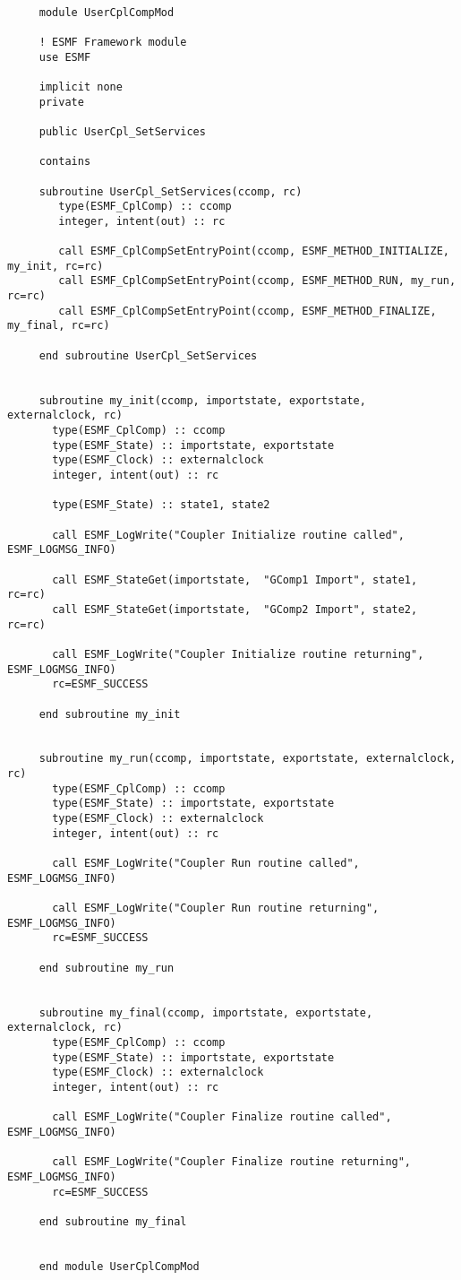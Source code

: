   
  \begin{verbatim}
 
     module UserCplCompMod
     
     ! ESMF Framework module
     use ESMF
     
     implicit none
     private
     
     public UserCpl_SetServices
 
     contains
 
     subroutine UserCpl_SetServices(ccomp, rc)
        type(ESMF_CplComp) :: ccomp
        integer, intent(out) :: rc
 
        call ESMF_CplCompSetEntryPoint(ccomp, ESMF_METHOD_INITIALIZE, my_init, rc=rc)
        call ESMF_CplCompSetEntryPoint(ccomp, ESMF_METHOD_RUN, my_run, rc=rc)
        call ESMF_CplCompSetEntryPoint(ccomp, ESMF_METHOD_FINALIZE, my_final, rc=rc)
 
     end subroutine UserCpl_SetServices
 
 
     subroutine my_init(ccomp, importstate, exportstate, externalclock, rc)
       type(ESMF_CplComp) :: ccomp
       type(ESMF_State) :: importstate, exportstate
       type(ESMF_Clock) :: externalclock
       integer, intent(out) :: rc
      
       type(ESMF_State) :: state1, state2
 
       call ESMF_LogWrite("Coupler Initialize routine called", ESMF_LOGMSG_INFO)
 
       call ESMF_StateGet(importstate,  "GComp1 Import", state1, rc=rc)
       call ESMF_StateGet(importstate,  "GComp2 Import", state2, rc=rc)
 
       call ESMF_LogWrite("Coupler Initialize routine returning", ESMF_LOGMSG_INFO)
       rc=ESMF_SUCCESS
 
     end subroutine my_init
 
 
     subroutine my_run(ccomp, importstate, exportstate, externalclock, rc)
       type(ESMF_CplComp) :: ccomp
       type(ESMF_State) :: importstate, exportstate
       type(ESMF_Clock) :: externalclock
       integer, intent(out) :: rc
      
       call ESMF_LogWrite("Coupler Run routine called", ESMF_LOGMSG_INFO)
 
       call ESMF_LogWrite("Coupler Run routine returning", ESMF_LOGMSG_INFO)
       rc=ESMF_SUCCESS
 
     end subroutine my_run
 
 
     subroutine my_final(ccomp, importstate, exportstate, externalclock, rc)
       type(ESMF_CplComp) :: ccomp
       type(ESMF_State) :: importstate, exportstate
       type(ESMF_Clock) :: externalclock
       integer, intent(out) :: rc
      
       call ESMF_LogWrite("Coupler Finalize routine called", ESMF_LOGMSG_INFO)
 
       call ESMF_LogWrite("Coupler Finalize routine returning", ESMF_LOGMSG_INFO)
       rc=ESMF_SUCCESS
 
     end subroutine my_final
 
 
     end module UserCplCompMod
     
  \end{verbatim}
     
\setlength{\parskip}{\oldparskip}
\setlength{\parindent}{\oldparindent}
\setlength{\baselineskip}{\oldbaselineskip}
